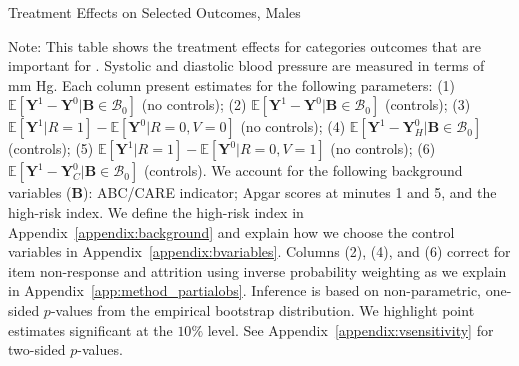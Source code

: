 \begin{table}
\centering
\begin{threeparttable}
\caption{Treatment Effects on Selected Outcomes, Males}\label{table:tescombinedmales}
\begin{scriptsize}

\end{scriptsize}
\begin{tablenotes}
\scriptsize
Note: This table shows the treatment effects for categories outcomes that are important for \citet{Garcia_Heckman_Leaf_etal_2017_Comp_CBA_Unpublished}. Systolic and diastolic blood pressure are measured in terms of mm Hg. Each column present estimates for the following parameters: (1) $\mathbb{E} \left [ \bm{Y}^1 -  \bm{Y}^0 | \bm{B} \in \mathcal{B}_{0} \right]$ (no controls); (2) $\mathbb{E} \left [ \bm{Y}^1 -  \bm{Y}^0 | \bm{B} \in \mathcal{B}_{0} \right]$ (controls); (3) $\mathbb{E} \left [ \bm{Y}^1 | R = 1 \right] -  \mathbb{E} \left [ \bm{Y}^0 | R = 0,V = 0  \right]$ (no controls); (4) $\mathbb{E} \left [ \bm{Y}^1 -  \bm{Y}_H^0 | \bm{B} \in \mathcal{B}_{0} \right]$ (controls); (5) $\mathbb{E} \left [ \bm{Y}^1 | R = 1 \right] -  \mathbb{E} \left [ \bm{Y}^0 | R = 0,V = 1 \right]$ (no controls); (6) $\mathbb{E} \left [ \bm{Y}^1 -  \bm{Y}_C^0 | \bm{B} \in \mathcal{B}_{0} \right]$ (controls). We account for the following background variables ($\bm{B}$): ABC/CARE indicator; Apgar scores at minutes 1 and 5, and the high-risk index. We define the high-risk index in Appendix~\ref{appendix:background} and explain how we choose the control variables in Appendix~\ref{appendix:bvariables}. Columns (2), (4), and (6) correct for item non-response and attrition using inverse probability weighting as we explain in Appendix~\ref{app:method_partialobs}. Inference is based on non-parametric, one-sided $p$-values from the empirical bootstrap distribution. We highlight point estimates significant at the $10\%$ level. See Appendix~\ref{appendix:vsensitivity} for two-sided $p$-values.\\
\end{tablenotes}
\end{threeparttable}
\end{table}
\doublespacing

